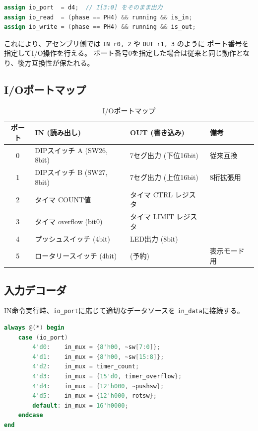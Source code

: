 \documentclass[a4paper,11pt]{ltjsarticle}
\begin{document}
\begin{lstlisting}[language=Verilog,caption={I/Oポート信号の生成}]
assign io_port  = d4;  // I[3:0] をそのまま出力
assign io_read  = (phase == PH4) && running && is_in;
assign io_write = (phase == PH4) && running && is_out;
\end{lstlisting}

これにより、アセンブリ側では \texttt{IN r0, 2} や \texttt{OUT r1, 3} のように
ポート番号を指定してI/O操作を行える。
ポート番号0を指定した場合は従来と同じ動作となり、後方互換性が保たれる。

\subsection{I/Oポートマップ}

\begin{table}[h]
\centering
\caption{I/Oポートマップ}
\begin{tabular}{clll}
\toprule
ポート & IN (読み出し) & OUT (書き込み) & 備考 \\
\midrule
0 & DIPスイッチ A (SW26, 8bit) & 7セグ出力 (下位16bit) & 従来互換 \\
1 & DIPスイッチ B (SW27, 8bit) & 7セグ出力 (上位16bit) & 8桁拡張用 \\
2 & タイマ COUNT値             & タイマ CTRL レジスタ    & \\
3 & タイマ overflow (bit0)     & タイマ LIMIT レジスタ   & \\
4 & プッシュスイッチ (4bit)    & LED出力 (8bit)          & \\
5 & ロータリースイッチ (4bit)  & (予約)                  & 表示モード用 \\
\bottomrule
\end{tabular}
\end{table}

\subsection{入力デコーダ}

IN命令実行時、\texttt{io\_port}に応じて適切なデータソースを
\texttt{in\_data}に接続する。

\begin{lstlisting}[language=Verilog,caption={I/O入力マルチプレクサ}]
always @(*) begin
    case (io_port)
        4'd0:    in_mux = {8'h00, ~sw[7:0]};
        4'd1:    in_mux = {8'h00, ~sw[15:8]};
        4'd2:    in_mux = timer_count;
        4'd3:    in_mux = {15'd0, timer_overflow};
        4'd4:    in_mux = {12'h000, ~pushsw};
        4'd5:    in_mux = {12'h000, rotsw};
        default: in_mux = 16'h0000;
    endcase
end
\end{lstlisting}
\end{document}
